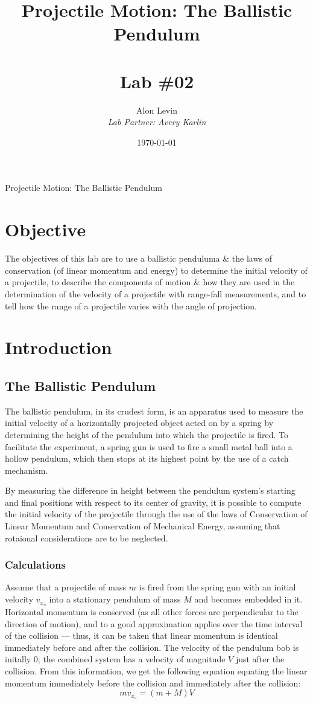 \documentclass[11pt, titlepage]{article}
\title{\Huge{Projectile Motion: The Ballistic Pendulum} \\ \ \\ \huge Lab \#02}
\author{\Large{Alon Levin} \\ \emph{Lab Partner: Avery Karlin}}
\date{\today}
\begin{document}
\maketitle

\begin{center}
\LARGE Projectile Motion: The Ballistic Pendulum
\end{center}

\section*{Objective}
The objectives of this lab are to use a ballistic penduluma \& the laws of conservation (of linear momentum and energy) to determine the initial velocity of a projectile, to describe the components of motion \& how they are used in the determination of the velocity of a projectile with range-fall measurements, and to tell how the range of a projectile varies with the angle of projection.

\section*{Introduction}
\subsection*{The Ballistic Pendulum}
The ballistic pendulum, in its crudest form, is an apparatus used to measure the initial velocity of a horizontally projected object acted on by a spring by determining the height of the pendulum into which the projectile is fired. To facilitate the experiment, a spring gun is used to fire a small metal ball into a hollow pendulum, which then stops at its highest point by the use of a catch mechanism.

By measuring the difference in height between the pendulum system's starting and final positions with respect to its center of gravity, it is possible to compute the initial velocity of the projectile through the use of the laws of Conservation of Linear Momentum and Conservation of Mechanical Energy, assuming that rotaional considerations are to be neglected. 

\subsubsection*{Calculations}
Assume that a projectile of mass $m$ is fired from the spring gun with an initial velocity $v_{x_o}$ into a stationary pendulum of mass $M$ and becomes embedded in it. Horizontal momentum is conserved (as all other forces are perpendicular to the direction of motion), and to a good approximation applies over the time interval of the collision --- thus, it can be taken that linear momentum is identical immediately before and after the collision. The velocity of the pendulum bob is initally $0$; the combined system has a velocity of magnitude $V$ just after the collision. From this information, we get the following equation equating the linear momentum immediately before the collision and immediately after the collision:
\begin{equation} \label{eq:1}
mv_{x_o} = (m+M)V
\end{equation}
\end{document}
